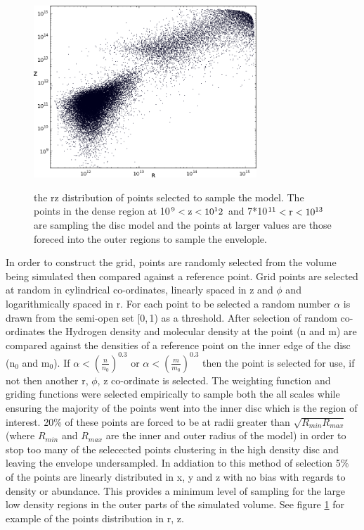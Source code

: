 \documentclass[useAMS,usenatbib]{mn2e}
\begin{document}
\begin{figure}
 \includegraphics[width=84mm]{Figures/model/lime_points_rz2.png}
 \label{points}
 \caption{the rz distribution of points selected to sample the model. The points in the dense region at 10$^9<\rm{z}<10^12$ and 7*10$^{11}<\rm{r}<10^{13}$ are sampling the disc model and the points at larger values are those foreced into the outer regions to sample the envelople.}
\end{figure}

In order to construct the grid, points are randomly selected from the volume being simulated then compared against a reference point. Grid points are selected at random in cylindrical co-ordinates, linearly spaced in z and $\phi$ and logarithmically spaced in r. For each point to be selected a random number $\alpha$ is drawn from the semi-open set [0,$\,$1) as a threshold. After selection of random co-ordinates the Hydrogen density and molecular density at the point (n and m) are compared against the densities of a reference point on the inner edge of the disc (n$_0$ and m$_0$). If $\alpha<\left( \frac{n}{n_0} \right)^{0.3}$ or $\alpha< \left( \frac{m}{m_0} \right)^{0.3}$ then the point is selected for use, if not then another r, $\phi$, z co-ordinate is selected. The weighting function and griding functions were selected empirically to sample both the all scales while ensuring the majority of the points went into the inner disc which is the region of interest. 20\% of these points are forced to be at radii greater than $\sqrt{R_{min}R_{max}}$ (where $R_{min}$ and $R_{max}$ are the inner and outer radius of the model) in order to stop too many of the selecected points clustering in the high density disc and leaving the envelope undersampled. In addiation to this method of selection 5\% of the points are linearly distributed in x, y and z with no bias with regards to density or abundance. This provides a minimum level of sampling for the large low density regions in the outer parts of the simulated volume. See figure \ref{points} for example of the points distribution in r, z. \newline
\end{document}
